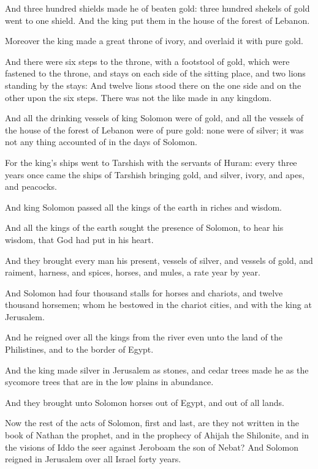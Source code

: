 \Verse And three hundred shields made he of beaten gold: three hundred shekels of gold went to one shield. And the king put them in the house of the forest of Lebanon.

\Verse Moreover the king made a great throne of ivory, and overlaid it with pure gold.

\Verse And there were six steps to the throne, with a footstool of gold, which were fastened to the throne, and stays on each side of the sitting place, and two lions standing by the stays: \Verse And twelve lions stood there on the one side and on the other upon the six steps.  There was not the like made in any kingdom.

\Verse And all the drinking vessels of king Solomon were of gold, and all the vessels of the house of the forest of Lebanon were of pure gold: none were of silver; it was not any thing accounted of in the days of Solomon.

\Verse For the king's ships went to Tarshish with the servants of Huram: every three years once came the ships of Tarshish bringing gold, and silver, ivory, and apes, and peacocks.

\Verse And king Solomon passed all the kings of the earth in riches and wisdom.

\Verse And all the kings of the earth sought the presence of Solomon, to hear his wisdom, that God had put in his heart.

\Verse And they brought every man his present, vessels of silver, and vessels of gold, and raiment, harness, and spices, horses, and mules, a rate year by year.

\Verse And Solomon had four thousand stalls for horses and chariots, and twelve thousand horsemen; whom he bestowed in the chariot cities, and with the king at Jerusalem.

\Verse And he reigned over all the kings from the river even unto the land of the Philistines, and to the border of Egypt.

\Verse And the king made silver in Jerusalem as stones, and cedar trees made he as the sycomore trees that are in the low plains in abundance.

\Verse And they brought unto Solomon horses out of Egypt, and out of all lands.

\Verse Now the rest of the acts of Solomon, first and last, are they not written in the book of Nathan the prophet, and in the prophecy of Ahijah the Shilonite, and in the visions of Iddo the seer against Jeroboam the son of Nebat?  \Verse And Solomon reigned in Jerusalem over all Israel forty years.


